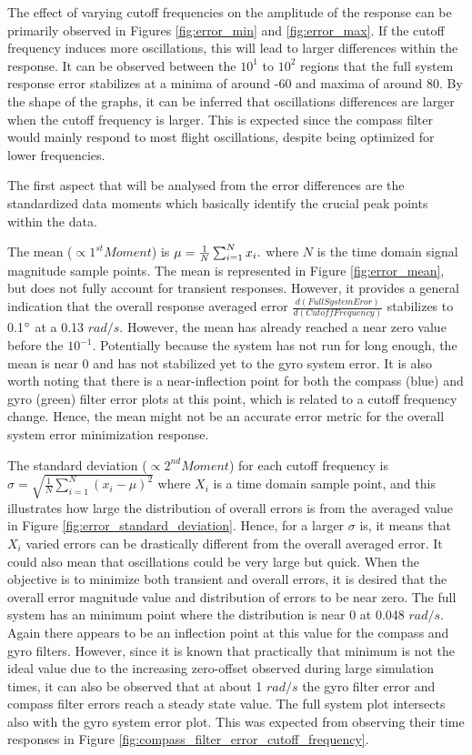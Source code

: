The effect of varying cutoff frequencies on the amplitude of the response can be primarily observed in Figures \ref{fig:error_min} and \ref{fig:error_max}. If the cutoff frequency induces more oscillations, this will lead to larger differences within the response. It can be observed between the $10^{1}$ to $10^{2}$ regions that the full system response error stabilizes at a minima of around -60 and maxima of around 80. By the shape of the graphs, it can be inferred that oscillations differences are larger when the cutoff frequency is larger. This is expected since the compass filter would mainly respond to most flight oscillations, despite being optimized for lower frequencies.

The first aspect that will be analysed from the error differences are the standardized data moments which basically identify the crucial peak points within the data.

The mean ($\propto 1^{st} Moment$) is ${\rm}\mu ={\frac {1}{N}}\sum _{i=1}^{N}x_{i}.$ where $N$ is the time domain signal magnitude sample points. The mean is represented in Figure \ref{fig:error_mean}, but does not fully account for transient responses. However, it provides a general indication that the overall response averaged error $\frac{d(FullSystemEror)}{d(CutoffFrequency)}$ stabilizes to 0.1$\degree$ at a 0.13 $rad/s$. However, the mean has already reached a near zero value before the $10^{-1}$. Potentially because the system has not run for long enough, the mean is near 0 and has not stabilized yet to the gyro system error. It is also worth noting that there is a near-inflection point for both the compass (blue) and gyro (green) filter error plots at this point, which is related to a cutoff frequency change. Hence, the mean might not be an accurate error metric for the overall system error minimization response. %

The standard deviation ($\propto 2^{nd} Moment$) for each cutoff frequency is $\sigma ={\sqrt {{\frac {1}{N}}\sum _{i=1}^{N}(x_{i}-\mu )^{2}}}$ where $X_i$ is a time domain sample point, and this illustrates how large the distribution of overall errors is from the averaged value in Figure \ref{fig:error_standard_deviation}. Hence, for a larger $\sigma$ is, it means that $X_i$ varied errors can be drastically different from the overall averaged error. It could also mean that oscillations could be very large but quick. When the objective is to minimize both transient and overall errors, it is desired that the overall error magnitude value and distribution of errors to be near zero. The full system has an minimum point where the distribution is near 0 at 0.048 $rad/s$. Again there appears to be an inflection point at this value for the compass and gyro filters. However, since it is known that practically that minimum is not the ideal value due to the increasing zero-offset observed during large simulation times, it can also be observed that at about 1 $rad/s$ the gyro filter error and compass filter errors reach a steady state value. The full system plot intersects also with the gyro system error plot. This was expected from observing their time responses in Figure \ref{fig:compass_filter_error_cutoff_frequency}.

